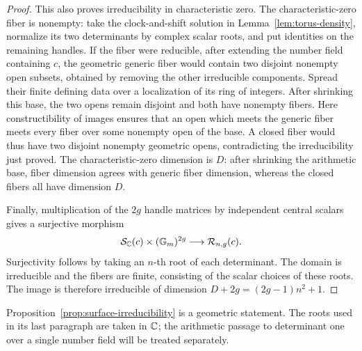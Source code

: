 \begin{proof}
This also proves irreducibility in characteristic zero.  The
characteristic-zero fiber is nonempty: take the clock-and-shift
solution in Lemma~\ref{lem:torus-density}, normalize its two
determinants by complex scalar roots, and put identities on the
remaining handles.  If the fiber were reducible,
after extending the number field containing \(c\), the geometric
generic fiber would contain two disjoint nonempty open subsets,
obtained by removing the other irreducible components.  Spread their
finite defining data over a localization of its ring of integers.
After shrinking this base, the two opens remain disjoint and both
have nonempty fibers.  Here constructibility of images ensures that
an open which meets the generic fiber meets every fiber over some
nonempty open of the base.  A closed fiber would thus have two
disjoint nonempty geometric opens, contradicting the irreducibility
just proved.  The characteristic-zero dimension is \(D\): after
shrinking the arithmetic base, fiber dimension agrees with generic
fiber dimension, whereas the closed fibers all have dimension \(D\).

Finally, multiplication of the \(2g\) handle matrices by independent
central scalars gives a surjective morphism
\[
 \mathcal S_{\mathbb C}(c)\times(\mathbb G_m)^{2g}
       \longrightarrow\mathcal R_{n,g}(c).
\]
Surjectivity follows by taking an \(n\)-th root of each determinant.
The domain is irreducible and the fibers are finite, consisting of
the scalar choices of these roots.  The image is therefore
irreducible of dimension \(D+2g=(2g-1)n^2+1\).
\end{proof}

Proposition~\ref{prop:surface-irreducibility} is a geometric statement.
The roots used in its last paragraph are taken in \(\mathbb C\); the
arithmetic passage to determinant one over a single number field
will be treated separately.
